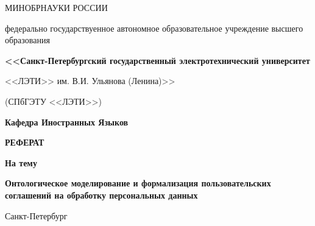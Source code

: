 \documentclass[../main.tex]{subfiles}
\begin{document}
\begin{titlepage}
    \centering

    МИНОБРНАУКИ РОССИИ

    федерально государствуенное автономное образовательное учреждение высшего образования

    {\bfseries\small
        <<Санкт-Петербургский государственный электротехнический университет

        <<ЛЭТИ>> им. В.И. Ульянова (Ленина)>>

        (СПбГЭТУ <<ЛЭТИ>>)
    }

    \vspace{1cm}

    \textbf{Кафедра Иностранных Языков}

    \vfill

    \MakeUppercase{\bfseries\Large
        реферат
    }

    {\bfseries
        На тему
    }

    {\bfseries
        Онтологическое моделирование и формализация пользовательских соглашений на обработку персональных данных
    }

    \vfill

    \hfill
     

    \vspace{5mm}

    \hfill
     

    \vspace{5mm}

    \hfill
     

    \vspace{2cm}

    Санкт-Петербург\\
    \the\year

\end{titlepage}

\setcounter{page}{2}
\end{document}
